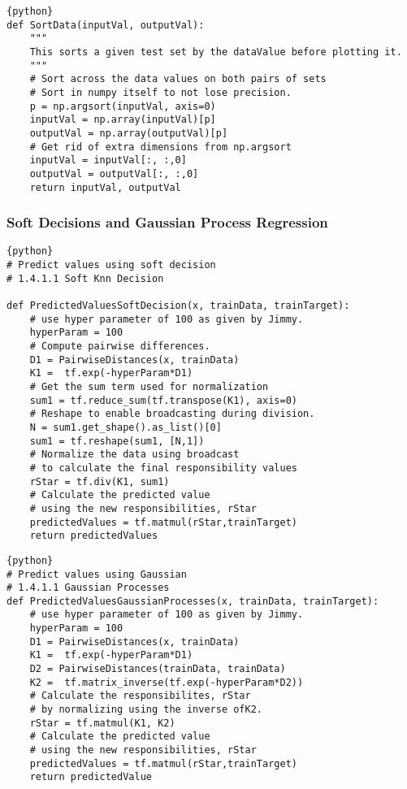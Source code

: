 \documentclass[a4paper,12pt]{article}
\begin{document}
\begin{verbatim}
{python}
def SortData(inputVal, outputVal):
    """
    This sorts a given test set by the dataValue before plotting it.
    """
    # Sort across the data values on both pairs of sets
    # Sort in numpy itself to not lose precision. 
    p = np.argsort(inputVal, axis=0)
    inputVal = np.array(inputVal)[p]
    outputVal = np.array(outputVal)[p]
    # Get rid of extra dimensions from np.argsort
    inputVal = inputVal[:, :,0]
    outputVal = outputVal[:, :,0]
    return inputVal, outputVal
\end{verbatim}

\subsubsection{Soft Decisions and Gaussian Process Regression}
\begin{verbatim}
{python}
# Predict values using soft decision
# 1.4.1.1 Soft Knn Decision

def PredictedValuesSoftDecision(x, trainData, trainTarget):
    # use hyper parameter of 100 as given by Jimmy. 
    hyperParam = 100
    # Compute pairwise differences. 
    D1 = PairwiseDistances(x, trainData)
    K1 =  tf.exp(-hyperParam*D1)
    # Get the sum term used for normalization
    sum1 = tf.reduce_sum(tf.transpose(K1), axis=0)
    # Reshape to enable broadcasting during division. 
    N = sum1.get_shape().as_list()[0]
    sum1 = tf.reshape(sum1, [N,1])
    # Normalize the data using broadcast
    # to calculate the final responsibility values
    rStar = tf.div(K1, sum1)
    # Calculate the predicted value 
    # using the new responsibilities, rStar
    predictedValues = tf.matmul(rStar,trainTarget)
    return predictedValues
\end{verbatim}

\begin{verbatim}
{python}
# Predict values using Gaussian
# 1.4.1.1 Gaussian Processes
def PredictedValuesGaussianProcesses(x, trainData, trainTarget):
    # use hyper parameter of 100 as given by Jimmy. 
    hyperParam = 100
    D1 = PairwiseDistances(x, trainData)
    K1 =  tf.exp(-hyperParam*D1)
    D2 = PairwiseDistances(trainData, trainData)
    K2 =  tf.matrix_inverse(tf.exp(-hyperParam*D2))
    # Calculate the responsibilites, rStar
    # by normalizing using the inverse ofK2. 
    rStar = tf.matmul(K1, K2)
    # Calculate the predicted value 
    # using the new responsibilities, rStar
    predictedValues = tf.matmul(rStar,trainTarget)
    return predictedValue
\end{verbatim}
\end{document}
